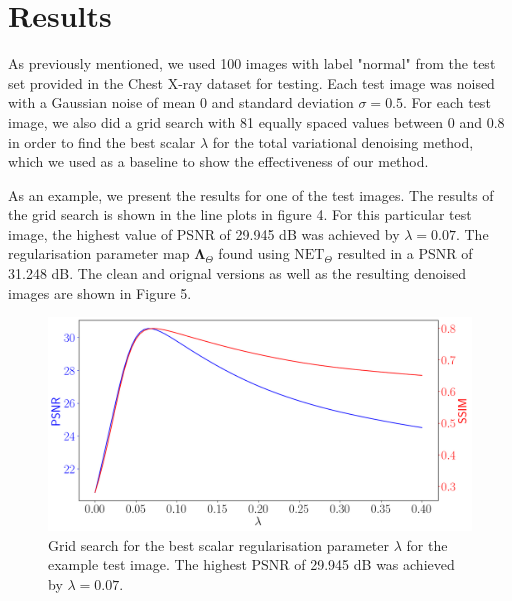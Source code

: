 \documentclass[12pt]{article}
\begin{document}




\section{Results}

As previously mentioned, we used 100 images with label "normal" from the test set provided in the Chest X-ray dataset for testing.
Each test image was noised with a Gaussian noise of mean 0 and standard deviation $\sigma = 0.5$.
For each test image, we also did a grid search with 81 equally spaced values between 0 and 0.8 in order to find the best scalar $\lambda$ for the total variational denoising method, which we used as a baseline to show the effectiveness of our method.


As an example, we present the results for one of the test images.
The results of the grid search is shown in the line plots in figure 4.
For this particular test image, the highest value of PSNR of 29.945 dB was achieved by $\lambda = 0.07$.
The regularisation parameter map $\mathbf{\Lambda}_\Theta$ found using $\text{NET}_{\Theta}$ resulted in a PSNR of 31.248 dB.
The clean and orignal versions as well as the resulting denoised images are shown in Figure 5.

\begin{figure}[H]
  \centering
  \includegraphics[width=0.66\linewidth]{images//chest_xray/ex_2/pyplot_multiple_y-axis.PNG}
  
      \caption{Grid search for the best scalar regularisation parameter $\lambda$ for the example test image. The highest PSNR of 29.945 dB was achieved by $\lambda = 0.07$.}
  \label{fig:line_plots}
\end{figure}
\end{document}
